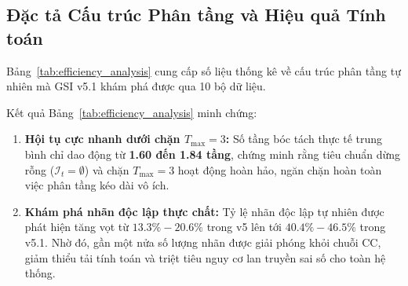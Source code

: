 \documentclass[11pt,a4paper]{article}
\begin{document}
\subsection{Đặc tả Cấu trúc Phân tầng và Hiệu quả Tính toán}
Bảng~\ref{tab:efficiency_analysis} cung cấp số liệu thống kê về cấu trúc phân tầng tự nhiên mà GSI v5.1 khám phá được qua 10 bộ dữ liệu.

\begin{table}[htbp]
\centering
\caption{Thống kê số tầng bóc tách trung bình, tỷ lệ nhãn độc lập và thời gian huấn luyện.}
\label{tab:efficiency_analysis}
\small
{}
\end{table}

\noindent Kết quả Bảng~\ref{tab:efficiency_analysis} minh chứng:
\begin{enumerate}
    \item \textbf{Hội tụ cực nhanh dưới chặn $T_{\max} = 3$:} Số tầng bóc tách thực tế trung bình chỉ dao động từ \textbf{1.60 đến 1.84 tầng}, chứng minh rằng tiêu chuẩn dừng rỗng ($\mathcal{I}_t = \emptyset$) và chặn $T_{\max} = 3$ hoạt động hoàn hảo, ngăn chặn hoàn toàn việc phân tầng kéo dài vô ích.
    \item \textbf{Khám phá nhãn độc lập thực chất:} Tỷ lệ nhãn độc lập tự nhiên được phát hiện tăng vọt từ $13.3\% - 20.6\%$ trong v5 lên tới \textbf{$40.4\% - 46.5\%$} trong v5.1. Nhờ đó, gần một nửa số lượng nhãn được giải phóng khỏi chuỗi CC, giảm thiểu tải tính toán và triệt tiêu nguy cơ lan truyền sai số cho toàn hệ thống.
\end{enumerate}
\end{document}
